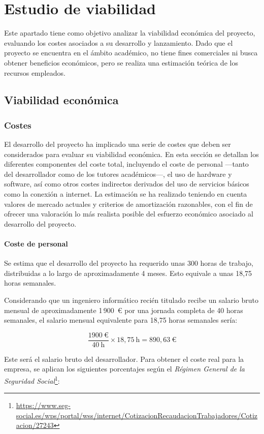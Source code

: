 \section{Estudio de viabilidad}
Este apartado tiene como objetivo analizar la viabilidad económica del proyecto, evaluando los costes asociados a su desarrollo y lanzamiento. Dado que el proyecto se encuentra en el ámbito académico, no tiene fines comerciales ni busca obtener beneficios económicos, pero se realiza una estimación teórica de los recursos empleados.

\subsection{Viabilidad económica}

\subsubsection{Costes}
El desarrollo del proyecto ha implicado una serie de costes que deben ser considerados para evaluar su viabilidad económica. En esta sección se detallan los diferentes componentes del coste total, incluyendo el coste de personal —tanto del desarrollador como de los tutores académicos—, el uso de hardware y software, así como otros costes indirectos derivados del uso de servicios básicos como la conexión a internet. La estimación se ha realizado teniendo en cuenta valores de mercado actuales y criterios de amortización razonables, con el fin de ofrecer una valoración lo más realista posible del esfuerzo económico asociado al desarrollo del proyecto.

\paragraph{Coste de personal}
Se estima que el desarrollo del proyecto ha requerido unas 300 horas de trabajo, distribuidas a lo largo de aproximadamente 4 meses. Esto equivale a unas 18,75 horas semanales.

Considerando que un ingeniero informático recién titulado recibe un salario bruto mensual de aproximadamente 1\,900~€ por una jornada completa de 40 horas semanales, el salario mensual equivalente para 18,75 horas semanales sería:

\[
\frac{1900~\text{€}}{40~\text{h}} \times 18{,}75~\text{h} = 890{,}63~\text{€}
\]

Este será el salario bruto del desarrollador. Para obtener el coste real para la empresa, se aplican los siguientes porcentajes según el \textit{Régimen General de la Seguridad Social}\footnote{\url{https://www.seg-social.es/wps/portal/wss/internet/CotizacionRecaudacionTrabajadores/Cotizacion/27243}}:

